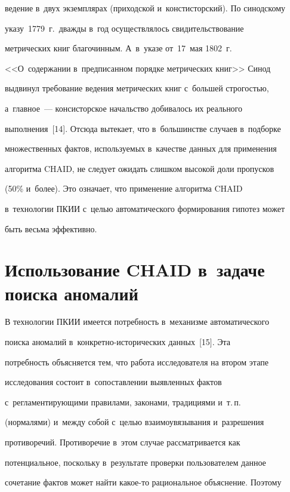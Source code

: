 ведение в~двух экземплярах (приходской и~констисторский). По синодскому 


указу~1779~г.\ дважды в~год осуществлялось свидительствование 


метрических книг благочинным. А~в~указе от~17~мая 1802~г.\ 


<<О~содержании в~предписанном порядке метрических книг>> Синод 


выдвинул требование ведения метрических книг с~большей строгостью, 


а~главное~--- консисторское начальство добивалось их реального 


выполнения~[14]. Отсюда вытекает, что в~большинстве случаев в~подборке 


множественных фактов, используемых в~качестве данных для применения 


алгоритма CHAID, не следует ожидать слишком высокой доли пропусков 


(50\% и~более). Это означает, что применение алгоритма CHAID 


в~технологии ПКИИ с~целью автоматического формирования гипотез может 


быть весьма эффективно.


  


\section{Использование CHAID в~задаче поиска аномалий}


  


  В технологии ПКИИ имеется потребность в~механизме автоматического 


поиска аномалий в~кон\-крет\-но-ис\-то\-ри\-че\-ских данных~[15]. Эта 


потребность объясняется тем, что работа исследователя на втором этапе 


исследования состоит в~сопоставлении выявленных фактов 


с~регламентирующими правилами, законами, традициями и~т.\,п.\ 


(нормалями) и~между собой с~целью взаимоувязывания и~разрешения 


противоречий. Противоречие в~этом случае рассматривается как 


потенциальное, поскольку в~результате проверки пользователем данное 


сочетание фактов может найти какое-то рациональное объяснение. Поэтому 


